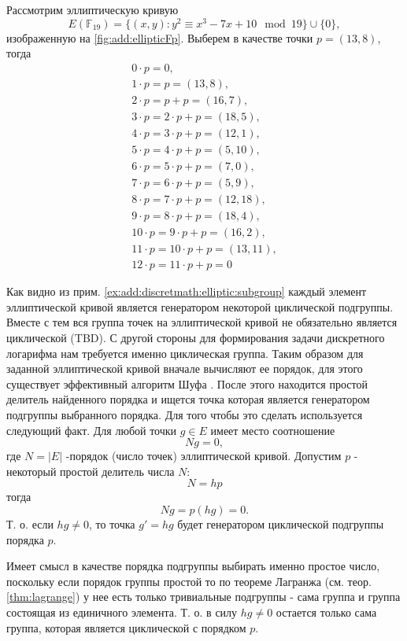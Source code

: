 \begin{example}
Рассмотрим эллиптическую кривую 
\[
E\left(\mathbb{F}_{19}\right) = 
\{(x,y): y^2 \equiv x^3 -7 x + 10 \mod 19 \} \cup \{0\},
\] 
изображенную на \autoref{fig:add:ellipticFp}. Выберем
в качестве точки $p = (13, 8)$, тогда 
\begin{eqnarray}
0 \cdot p = 0, \nonumber \\
1 \cdot p = p = (13,8), \nonumber \\
2 \cdot p = p + p = (16,7), \nonumber \\
3 \cdot p = 2 \cdot p + p = (18,5), \nonumber \\
4 \cdot p = 3 \cdot p + p = (12,1), \nonumber \\
5 \cdot p = 4 \cdot p + p = (5,10), \nonumber \\
6 \cdot p = 5 \cdot p +p = (7,0), \nonumber \\
7 \cdot p = 6 \cdot p + p = (5,9), \nonumber \\
8 \cdot p = 7 \cdot p +p = (12,18), \nonumber \\
9 \cdot p = 8 \cdot p + p = (18,4), \nonumber \\
10 \cdot p = 9 \cdot p + p = (16,2), \nonumber \\
11 \cdot p = 10 \cdot p + p = (13,11), \nonumber \\
12 \cdot p = 11 \cdot p + p = 0
\nonumber 
\end{eqnarray}
\label{ex:add:discretmath:elliptic:subgroup}
\end{example}
Как видно из прим. \ref{ex:add:discretmath:elliptic:subgroup} каждый
элемент эллиптической кривой является генератором некоторой
циклической подгруппы. Вместе с тем вся группа точек на эллиптической
кривой не обязательно является циклической 
(TBD).
С другой стороны для формирования задачи дискретного логарифма нам
требуется именно циклическая группа. Таким образом для заданной
эллиптической кривой вначале вычисляют ее порядок, для этого
существует эффективный алгоритм Шуфа \cite{ReneSchoof:1985}. После
этого находится простой делитель найденного порядка и ищется точка
которая является генератором подгруппы выбранного порядка. Для того
чтобы это сделать используется следующий факт. Для любой точки 
$g \in E$ имеет место соотношение
\[
N g = 0,
\]
где $N = \left|E\right|$ -порядок (число точек) эллиптической кривой.
Допустим $p$ - некоторый простой делитель числа $N$:
\[
N = h p
\]
тогда
\[
N g = p \left( h g \right) = 0.
\]
Т. о. если $hg \ne 0$, то точка $g' = h g$ будет генератором
циклической подгруппы порядка $p$.
\begin{remark}
Имеет смысл в качестве порядка подгруппы выбирать именно простое
число, поскольку если порядок группы простой то по теореме Лагранжа
(см. теор. \ref{thm:lagrange})  у нее есть
только тривиальные подгруппы - сама группа и группа состоящая из
единичного элемента. Т. о. в силу $hg \ne 0$ остается только сама
группа, которая является циклической с порядком $p$. 
\end{remark}

